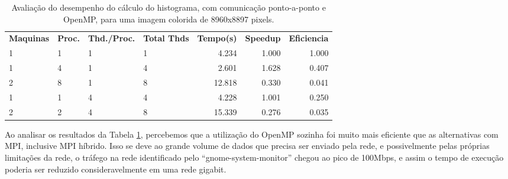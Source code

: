 \documentclass[conference]{IEEEtran}
\begin{document}
\begin{table}[htb!]
  \centering
	\begin{adjustbox}{max width=\linewidth}
	\begin{tabular}{llllrrr}%
		\bfseries Maquinas & \bfseries Proc. & \bfseries Thd./Proc. & \bfseries Total Thds & \bfseries Tempo(s) & \bfseries Speedup & \bfseries Eficiencia \\
    1	& 1	& 1	& 1	& 4.234	 & 1.000 & 1.000 \\
    1	& 4	& 1	& 4	& 2.601	 & 1.628 & 0.407 \\
    2	& 8	& 1	& 8	& 12.818 & 0.330 & 0.041 \\
    1	& 1	& 4	& 4	& 4.228	 & 1.001 & 0.250 \\
    2	& 2	& 4	& 8	& 15.339 & 0.276 & 0.035 \\
	\end{tabular}
	\end{adjustbox}
	\caption{\label{tab:ex04}Avaliação do desempenho do cálculo do histograma, com comunicação ponto-a-ponto e OpenMP, para uma imagem colorida de 8960x8897 pixels.}
\end{table}

Ao analisar os resultados da Tabela \ref{tab:ex04}, percebemos que a utilização do OpenMP sozinha foi muito mais eficiente que as alternativas com MPI, inclusive MPI híbrido. Isso se deve ao grande volume de dados que precisa ser enviado pela rede, e possivelmente pelas próprias limitações da rede, o tráfego na rede identificado pelo ``gnome-system-monitor'' chegou ao pico de 100Mbps, e assim o tempo de execução poderia ser reduzido consideravelmente em uma rede gigabit.



%
\end{document}
